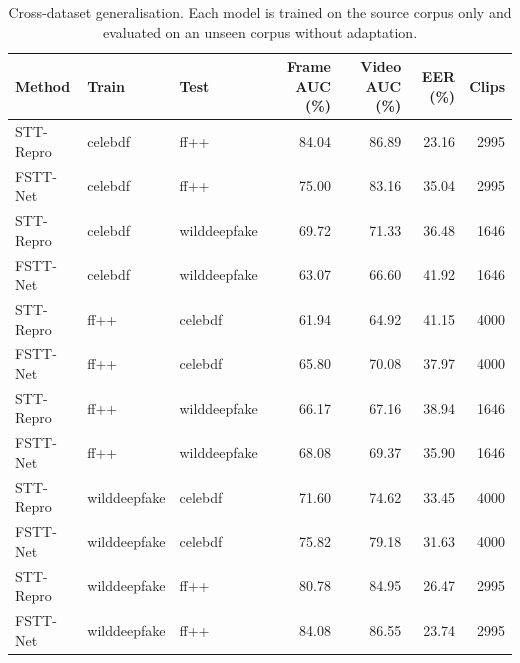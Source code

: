 \begin{table}[!t]
\centering
\caption{Cross-dataset generalisation. Each model is trained on the source corpus only and evaluated on an unseen corpus without adaptation.}
\label{tab:tableIV_cross_dataset}
\footnotesize
\begin{tabular}{lllrrrr}
\hline\hline
Method & Train & Test & Frame AUC (\%) & Video AUC (\%) & EER (\%) & Clips \\
\hline
STT-Repro & celebdf & ff++ & 84.04 & 86.89 & 23.16 & 2995 \\
FSTT-Net & celebdf & ff++ & 75.00 & 83.16 & 35.04 & 2995 \\
STT-Repro & celebdf & wilddeepfake & 69.72 & 71.33 & 36.48 & 1646 \\
FSTT-Net & celebdf & wilddeepfake & 63.07 & 66.60 & 41.92 & 1646 \\
STT-Repro & ff++ & celebdf & 61.94 & 64.92 & 41.15 & 4000 \\
FSTT-Net & ff++ & celebdf & 65.80 & 70.08 & 37.97 & 4000 \\
STT-Repro & ff++ & wilddeepfake & 66.17 & 67.16 & 38.94 & 1646 \\
FSTT-Net & ff++ & wilddeepfake & 68.08 & 69.37 & 35.90 & 1646 \\
STT-Repro & wilddeepfake & celebdf & 71.60 & 74.62 & 33.45 & 4000 \\
FSTT-Net & wilddeepfake & celebdf & 75.82 & 79.18 & 31.63 & 4000 \\
STT-Repro & wilddeepfake & ff++ & 80.78 & 84.95 & 26.47 & 2995 \\
FSTT-Net & wilddeepfake & ff++ & 84.08 & 86.55 & 23.74 & 2995 \\
\hline\hline
\end{tabular}
\end{table}
